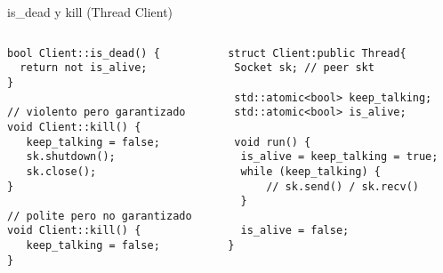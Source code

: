 \begin{frame}[fragile]{is\_dead y kill (Thread Client)}{}
    \begin{columns}[T]
      \begin{column}{.45\linewidth}
\begin{lstlisting}[style=normalnonumbers]
bool Client::is_dead() {
  return not is_alive;
}

// violento pero garantizado
void Client::kill() {
   keep_talking = false;
   sk.shutdown();
   sk.close();
}

// polite pero no garantizado
void Client::kill() {
   keep_talking = false;
}
\end{lstlisting}
      \end{column}
      \begin{column}{.55\linewidth}
\begin{lstlisting}[style=normalnonumbers]
struct Client:public Thread{
 Socket sk; // peer skt

 std::atomic<bool> keep_talking;
 std::atomic<bool> is_alive;

 void run() {
  is_alive = keep_talking = true;
  while (keep_talking) {
      // sk.send() / sk.recv()
  }

  is_alive = false;
}
\end{lstlisting}
      \end{column}
      \end{columns}
\end{frame}
